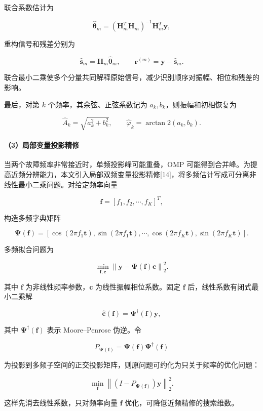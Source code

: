 \documentclass[UTF8,a4paper,12pt]{ctexart}
\numberwithin{figure}{section}
\numberwithin{table}{section}
\begin{document}
联合系数估计为


\[
\hat{\boldsymbol\theta}_m
=
(\mathbf H_m^T\mathbf H_m)^{-1}\mathbf H_m^T\mathbf y,
\]


重构信号和残差分别为


\[
\hat{\mathbf s}_m=\mathbf H_m\hat{\boldsymbol\theta}_m,
\qquad
\mathbf r^{(m)}=\mathbf y-\hat{\mathbf s}_m.
\]


联合最小二乘使多个分量共同解释原始信号，减少识别顺序对振幅、相位和残差的影响。


最后，对第 \(k\) 个频率，其余弦、正弦系数记为 \(a_k,b_k\)，则振幅和初相恢复为


\[
\hat A_k=\sqrt{a_k^2+b_k^2},
\qquad
\hat\varphi_k=\arctan2(a_k,b_k).
\]


\paragraph{（3）局部变量投影精修}


当两个故障频率非常接近时，单频投影峰可能重叠，OMP 可能得到合并峰。为提高近频分辨能力，本文引入局部双频变量投影精修[14]，将多频估计写成可分离非线性最小二乘问题。对给定频率向量


\[
\mathbf f=[f_1,f_2,\cdots,f_K]^T,
\]


构造多频字典矩阵


\[
\boldsymbol\Psi(\mathbf f)=
\left[
\cos(2\pi f_1\mathbf t),\sin(2\pi f_1\mathbf t),
\cdots,
\cos(2\pi f_K\mathbf t),\sin(2\pi f_K\mathbf t)
\right].
\]


多频拟合问题为


\[
\min_{\mathbf f,\mathbf c}
\left\|
\mathbf y-\boldsymbol\Psi(\mathbf f)\mathbf c
\right\|_2^2.
\]


其中 \(\mathbf f\) 为非线性频率参数，\(\mathbf c\) 为线性振幅相位系数。固定 \(\mathbf f\) 后，线性系数有闭式最小二乘解


\[
\hat{\mathbf c}(\mathbf f)
=
\boldsymbol\Psi^\dagger(\mathbf f)\mathbf y,
\]


其中 \(\boldsymbol\Psi^\dagger(\mathbf f)\) 表示 Moore--Penrose 伪逆。令


\[
P_{\boldsymbol\Psi(\mathbf f)}
=
\boldsymbol\Psi(\mathbf f)\boldsymbol\Psi^\dagger(\mathbf f)
\]


为投影到多频子空间的正交投影矩阵，则原问题可约化为只关于频率的优化问题：


\[
\min_{\mathbf f}
\left\|
\left(I-P_{\boldsymbol\Psi(\mathbf f)}\right)\mathbf y
\right\|_2^2.
\]


这样先消去线性系数，只对频率向量 \(\mathbf f\) 优化，可降低近频精修的搜索维数。
\end{document}
